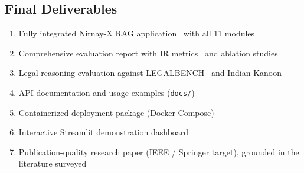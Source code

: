 \documentclass[12pt,a4paper]{article}
\begin{document}
\subsection{Final Deliverables}

\begin{enumerate}[leftmargin=*, label=\arabic*.]
  \item Fully integrated Nirnay-X RAG application~\cite{lewis2020rag} with all
    11 modules~\cite{ashley2017ai}
  \item Comprehensive evaluation report with IR metrics~\cite{manning2008ir}
    and ablation studies
  \item Legal reasoning evaluation against LEGALBENCH~\cite{guha2023legalbench}
    and Indian Kanoon~\cite{indiankanoon}
  \item API documentation and usage examples (\texttt{docs/})
  \item Containerized deployment package (Docker Compose)
  \item Interactive Streamlit demonstration dashboard
  \item Publication-quality research paper (IEEE / Springer target), grounded in
    the literature surveyed~\cite{lewis2020rag, vaswani2017attention, reimers2019sbert,
    devlin2019bert, feng2022survey, ashley2017ai, guha2023legalbench}
\end{enumerate}
\end{document}
